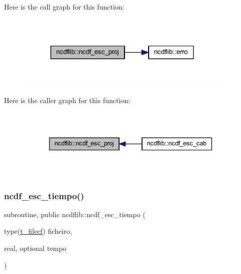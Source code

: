 Here is the call graph for this function\+:\nopagebreak
\begin{figure}[H]
\begin{center}
\leavevmode
\includegraphics[width=293pt]{namespacencdflib_ab26646e33f23098c9a84e29cc33af7bc_cgraph}
\end{center}
\end{figure}
Here is the caller graph for this function\+:\nopagebreak
\begin{figure}[H]
\begin{center}
\leavevmode
\includegraphics[width=336pt]{namespacencdflib_ab26646e33f23098c9a84e29cc33af7bc_icgraph}
\end{center}
\end{figure}
\mbox{\label{namespacencdflib_a70418482c5ffef91933942850702610f}} 
\subsubsection{\texorpdfstring{ncdf\+\_\+esc\+\_\+tiempo()}{ncdf\_esc\_tiempo()}}
{\footnotesize\ttfamily subroutine, public ncdflib\+::ncdf\+\_\+esc\+\_\+tiempo (\begin{DoxyParamCaption}\item[{type(\mbox{\hyperlink{structncdflib_1_1t__filecf}{t\+\_\+filecf}})}]{ficheiro,  }\item[{real, optional}]{tempo }\end{DoxyParamCaption})}

